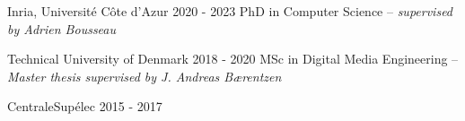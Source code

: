 

\begin{cventries}


  \cventry
    {Inria, Université Côte d'Azur} %
    {2020 - 2023} %
    {PhD in Computer Science -- \textit{supervised by Adrien Bousseau}} 

  \cventry
    {Technical University of Denmark} %
    {2018 - 2020} %
  	{MSc in Digital Media Engineering -- \textit{Master thesis supervised by J. Andreas Bærentzen}} %
    
 
 \cventry
    {CentraleSupélec} %
    {2015 - 2017} %
    {
    }
    
    

\end{cventries}
